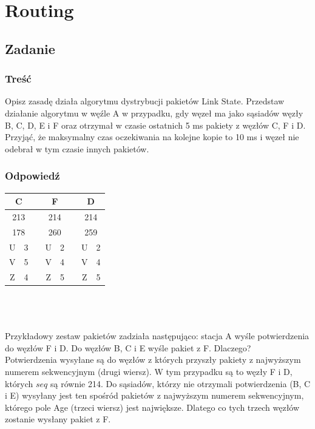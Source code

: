 \section{Routing}
	\subsection{Zadanie}
		\subsubsection{Treść}
			Opisz zasadę działa algorytmu dystrybucji pakietów Link State. Przedstaw działanie algorytmu w węźle A w przypadku, gdy węzeł ma jako sąsiadów węzły B, C, D, E i F oraz otrzymał w czasie ostatnich 5 ms pakiety z węzłów C, F i D. Przyjąć, że maksymalny czas oczekiwania na kolejne kopie to 10 ms i węzeł nie odebrał w tym czasie innych pakietów.
		\subsubsection{Odpowiedź}
				\begin{tabular}{|c|c|c|c|c|c|c|c|}
					\hline \multicolumn{2}{|c|}{\textbf{C}}  & & \multicolumn{2}{|c|}{\textbf{F}} & & \multicolumn{2}{|c|}{\textbf{D}}\\ 
					\hline \multicolumn{2}{|c|}{213} & &\multicolumn{2}{|c|}{214} & &\multicolumn{2}{|c|}{214} \\ 
					\hline \multicolumn{2}{|c|}{178} & &\multicolumn{2}{|c|}{260} & &\multicolumn{2}{|c|}{259}   \\ 
					\hline U & 3 & & U & 2 & & U & 2\\ 
					\hline V & 5 & & V & 4 & & V & 4\\
					\hline Z & 4 & & Z & 5 & & Z & 5\\
					\hline 
				\end{tabular}\\\\\\
			Przykładowy zestaw pakietów zadziała następująco: stacja A wyśle potwierdzenia do węzłów F i D. Do węzłów B, C i E wyśle pakiet z F. Dlaczego?\\
			Potwierdzenia wysyłane są do węzłów z których przyszły pakiety z najwyższym numerem sekwencyjnym (drugi wiersz). W tym przypadku są to węzły F i D, których $ seq $ są równie 214. Do sąsiadów, którzy nie otrzymali potwierdzenia (B, C i E) wysyłany jest ten spośród pakietów z najwyższym numerem sekwencyjnym, którego pole Age (trzeci wiersz) jest największe. Dlatego co tych trzech węzłów zostanie wysłany pakiet z F.
\newpage
